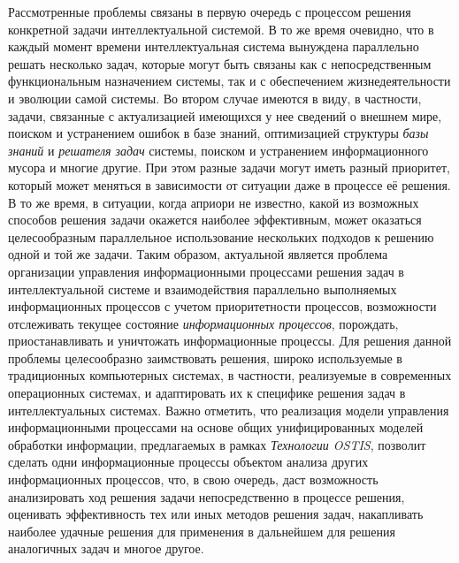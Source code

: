 Рассмотренные проблемы связаны в первую очередь с процессом решения конкретной задачи интеллектуальной системой. В то же время очевидно, что в каждый момент времени интеллектуальная система вынуждена параллельно решать несколько задач, которые могут быть связаны как с непосредственным функциональным назначением системы, так и с обеспечением жизнедеятельности и эволюции самой системы. Во втором случае имеются в виду, в частности, задачи, связанные с актуализацией имеющихся у нее сведений о внешнем мире, поиском и устранением ошибок в базе знаний, оптимизацией структуры \textit{базы знаний} и \textit{решателя задач} системы, поиском и устранением информационного мусора и многие другие. При этом разные задачи могут иметь разный приоритет, который может меняться в зависимости от ситуации даже в процессе её решения. В то же время, в ситуации, когда априори не известно, какой из возможных способов решения задачи окажется наиболее эффективным, может оказаться целесообразным параллельное использование нескольких подходов к решению одной и той же задачи. Таким образом, актуальной является проблема организации управления информационными процессами решения задач в интеллектуальной системе и взаимодействия параллельно выполняемых информационных процессов с учетом приоритетности процессов, возможности отслеживать текущее состояние \textit{информационных процессов}, порождать, приостанавливать и уничтожать информационные процессы. Для решения данной проблемы целесообразно заимствовать решения, широко используемые в традиционных компьютерных системах, в частности, реализуемые в современных операционных системах, и адаптировать их к специфике решения задач в интеллектуальных системах. Важно отметить, что реализация модели управления информационными процессами на основе общих унифицированных моделей обработки информации, предлагаемых в рамках \textit{Технологии OSTIS}, позволит сделать одни информационные процессы объектом анализа других информационных процессов, что, в свою очередь, даст возможность анализировать ход решения задачи непосредственно в процессе решения, оценивать эффективность тех или иных методов решения задач, накапливать наиболее удачные решения для применения в дальнейшем для решения аналогичных задач и многое другое.

